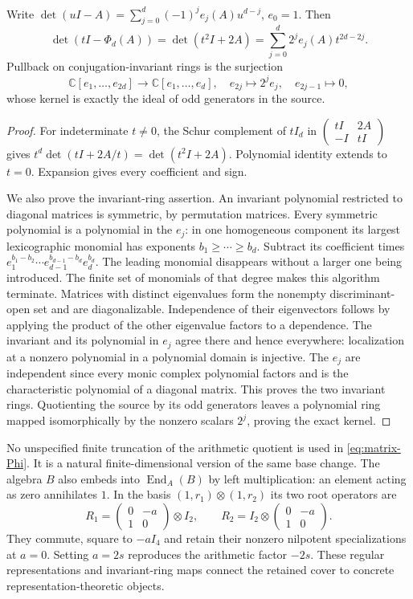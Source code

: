 \begin{proposition}
\label{prop:matrix-invariants}
Write $\det(uI-A)=\sum_{j=0}^d(-1)^je_j(A)u^{d-j}$, $e_0=1$.
Then
\[
 \det(tI-\Phi_d(A))=\det(t^2I+2A)
   =\sum_{j=0}^d2^je_j(A)t^{2d-2j}.
\]
Pullback on conjugation-invariant rings is the surjection
\[
 \mathbb C[e_1,\ldots,e_{2d}]\longrightarrow\mathbb C[e_1,\ldots,e_d],
 \quad e_{2j}\mapsto2^je_j,\quad e_{2j-1}\mapsto0,
\]
whose kernel is exactly the ideal of odd generators in the source.
\end{proposition}
\begin{proof}
For indeterminate $t\ne0$, the Schur complement of $tI_d$ in
$\left(\begin{smallmatrix}tI&2A\\-I&tI\end{smallmatrix}\right)$ gives
$t^d\det(tI+2A/t)=\det(t^2I+2A)$. Polynomial identity extends to $t=0$.
Expansion gives every coefficient and sign.

We also prove the invariant-ring assertion. An invariant polynomial
restricted to diagonal matrices is symmetric, by permutation matrices.
Every symmetric polynomial is a polynomial in the $e_j$:
in one homogeneous component its largest lexicographic monomial has
exponents $b_1\ge\cdots\ge b_d$. Subtract its coefficient times
$e_1^{b_1-b_2}\cdots e_{d-1}^{b_{d-1}-b_d}e_d^{b_d}$.
The leading monomial disappears without a larger one being introduced.
The finite set of monomials of that degree makes this algorithm terminate.
Matrices with distinct eigenvalues form the nonempty discriminant-open
set and are diagonalizable. Independence of their eigenvectors follows
by applying the product of the other eigenvalue factors to a dependence.
The invariant and its polynomial in $e_j$ agree there and hence everywhere:
localization at a nonzero polynomial in a polynomial domain is injective.
The $e_j$ are independent since every monic complex polynomial factors
and is the characteristic polynomial of a diagonal matrix.
This proves the two invariant rings. Quotienting the source by its odd
generators leaves a polynomial ring mapped isomorphically by the nonzero
scalars $2^j$, proving the exact kernel.
\end{proof}

No unspecified finite truncation of the arithmetic quotient is used in
\eqref{eq:matrix-Phi}. It is a natural finite-dimensional version of the
same base change. The algebra $B$ also embeds into $\operatorname{End}_A(B)$
by left multiplication: an element acting as zero annihilates $1$.
In the basis $(1,r_1)\otimes(1,r_2)$ its two root operators are
\[
 R_1=\begin{pmatrix}0&-a\\1&0\end{pmatrix}\otimes I_2,\qquad
 R_2=I_2\otimes\begin{pmatrix}0&-a\\1&0\end{pmatrix}.
\]
They commute, square to $-aI_4$ and retain their nonzero nilpotent
specializations at $a=0$. Setting $a=2s$ reproduces the arithmetic
factor $-2s$. These regular representations and invariant-ring maps
connect the retained cover to concrete representation-theoretic objects.

